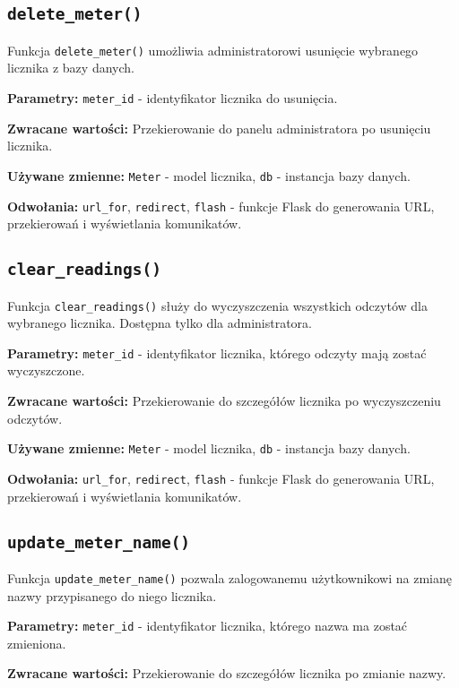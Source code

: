 \documentclass[12pt,a4paper]{report}
\begin{document}
\subsection{\texttt{delete\_meter()}}
\label{sec:delete_meter}
Funkcja \texttt{delete\_meter()} umożliwia administratorowi usunięcie wybranego licznika z bazy danych.

\textbf{Parametry:} \texttt{meter\_id} - identyfikator licznika do usunięcia.

\textbf{Zwracane wartości:} Przekierowanie do panelu administratora po usunięciu licznika.

\textbf{Używane zmienne:} \texttt{Meter} - model licznika, \texttt{db} - instancja bazy danych.

\textbf{Odwołania:} \texttt{url\_for}, \texttt{redirect}, \texttt{flash} - funkcje Flask do generowania URL, przekierowań i wyświetlania komunikatów.

\subsection{\texttt{clear\_readings()}}
\label{sec:clear_readings}
Funkcja \texttt{clear\_readings()} służy do wyczyszczenia wszystkich odczytów dla wybranego licznika. Dostępna tylko dla administratora.

\textbf{Parametry:} \texttt{meter\_id} - identyfikator licznika, którego odczyty mają zostać wyczyszczone.

\textbf{Zwracane wartości:} Przekierowanie do szczegółów licznika po wyczyszczeniu odczytów.

\textbf{Używane zmienne:} \texttt{Meter} - model licznika, \texttt{db} - instancja bazy danych.

\textbf{Odwołania:} \texttt{url\_for}, \texttt{redirect}, \texttt{flash} - funkcje Flask do generowania URL, przekierowań i wyświetlania komunikatów.

\subsection{\texttt{update\_meter\_name()}}
\label{sec:update_meter_name}
Funkcja \texttt{update\_meter\_name()} pozwala zalogowanemu użytkownikowi na zmianę nazwy przypisanego do niego licznika.

\textbf{Parametry:} \texttt{meter\_id} - identyfikator licznika, którego nazwa ma zostać zmieniona.

\textbf{Zwracane wartości:} Przekierowanie do szczegółów licznika po zmianie nazwy.
\end{document}
